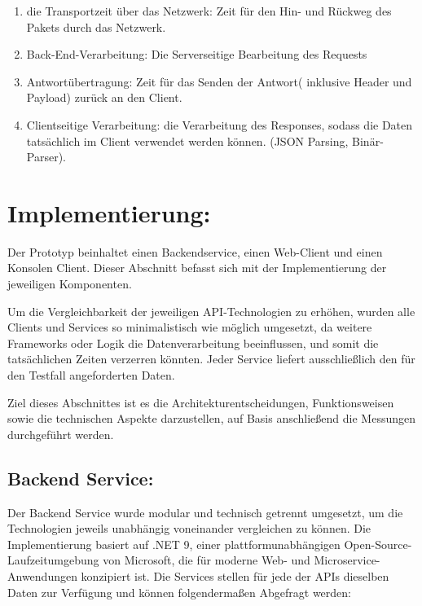 \begin{enumerate}
	\item die Transportzeit über das Netzwerk:
	Zeit für den Hin- und Rückweg des Pakets durch das Netzwerk.
	
	\item Back-End-Verarbeitung:
	Die Serverseitige Bearbeitung des Requests
	
	\item Antwortübertragung:
	Zeit für das Senden der Antwort( inklusive Header und Payload) zurück an den Client.
	
	\item Clientseitige Verarbeitung:
	die Verarbeitung des Responses, sodass die Daten tatsächlich im Client verwendet werden können. (JSON Parsing, Binär-Parser).
	
\end{enumerate}

\clearpage
\section{Implementierung:}
Der Prototyp beinhaltet einen Backendservice, einen Web-Client und einen Konsolen Client. Dieser Abschnitt befasst sich mit der Implementierung der jeweiligen Komponenten. 

Um die Vergleichbarkeit der jeweiligen API-Technologien zu erhöhen, wurden alle Clients und Services so minimalistisch wie möglich umgesetzt, da weitere Frameworks oder Logik die Datenverarbeitung beeinflussen, und somit die tatsächlichen Zeiten verzerren könnten.
Jeder Service liefert ausschließlich den für den Testfall angeforderten Daten. 

Ziel dieses Abschnittes ist es die Architekturentscheidungen, Funktionsweisen sowie die technischen Aspekte darzustellen, auf Basis anschließend die Messungen durchgeführt werden.

\subsection{Backend Service:}

Der Backend Service wurde modular und technisch getrennt umgesetzt, um die Technologien jeweils unabhängig voneinander vergleichen zu können. Die Implementierung basiert auf .NET 9, einer plattformunabhängigen Open-Source-Laufzeitumgebung von Microsoft, die für moderne Web- und Microservice-Anwendungen konzipiert ist.
Die Services stellen für jede der APIs dieselben Daten zur Verfügung und können folgendermaßen Abgefragt werden:

